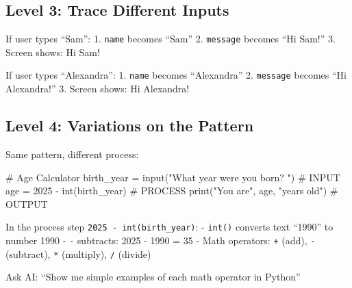 \documentclass[
  letterpaper,
  DIV=11,
  numbers=noendperiod,
  oneside]{scrreprt}
\newenvironment{Shaded}{}{}
\newcommand{\BuiltInTok}[1]{\textcolor[rgb]{0.84,0.23,0.29}{#1}}
\newcommand{\CommentTok}[1]{\textcolor[rgb]{0.42,0.45,0.49}{#1}}
\newcommand{\DecValTok}[1]{\textcolor[rgb]{0.00,0.36,0.77}{#1}}
\newcommand{\NormalTok}[1]{\textcolor[rgb]{0.14,0.16,0.18}{#1}}
\newcommand{\OperatorTok}[1]{\textcolor[rgb]{0.14,0.16,0.18}{#1}}
\newcommand{\StringTok}[1]{\textcolor[rgb]{0.01,0.18,0.38}{#1}}
\begin{document}
\subsection{Level 3: Trace Different
Inputs}\label{level-3-trace-different-inputs}

If user types ``Sam'': 1. \texttt{name} becomes ``Sam'' 2.
\texttt{message} becomes ``Hi Sam!'' 3. Screen shows: Hi Sam!

If user types ``Alexandra'': 1. \texttt{name} becomes ``Alexandra'' 2.
\texttt{message} becomes ``Hi Alexandra!'' 3. Screen shows: Hi
Alexandra!

\subsection{Level 4: Variations on the
Pattern}\label{level-4-variations-on-the-pattern}

Same pattern, different process:

\begin{Shaded}
\begin{Highlighting}[]
\CommentTok{\# Age Calculator}
\NormalTok{birth\_year }\OperatorTok{=} \BuiltInTok{input}\NormalTok{(}\StringTok{"What year were you born? "}\NormalTok{)     }\CommentTok{\# INPUT}
\NormalTok{age }\OperatorTok{=} \DecValTok{2025} \OperatorTok{{-}} \BuiltInTok{int}\NormalTok{(birth\_year)                        }\CommentTok{\# PROCESS}
\BuiltInTok{print}\NormalTok{(}\StringTok{"You are"}\NormalTok{, age, }\StringTok{"years old"}\NormalTok{)                  }\CommentTok{\# OUTPUT}
\end{Highlighting}
\end{Shaded}

\begin{tcolorbox}[enhanced jigsaw, opacityback=0, colback=white, colframe=quarto-callout-note-color-frame, breakable, titlerule=0mm, coltitle=black, rightrule=.15mm, colbacktitle=quarto-callout-note-color!10!white, left=2mm, bottomtitle=1mm, bottomrule=.15mm, title=\textcolor{quarto-callout-note-color}{\faInfo}\hspace{0.5em}{Expression Explorer: Math and Type Conversion}, opacitybacktitle=0.6, toptitle=1mm, leftrule=.75mm, arc=.35mm, toprule=.15mm]

In the process step \texttt{2025\ -\ int(birth\_year)}: - \texttt{int()}
converts text ``1990'' to number 1990 - \texttt{-} subtracts: 2025 -
1990 = 35 - Math operators: \texttt{+} (add), \texttt{-} (subtract),
\texttt{*} (multiply), \texttt{/} (divide)

Ask AI: ``Show me simple examples of each math operator in Python''

\end{tcolorbox}
\end{document}
